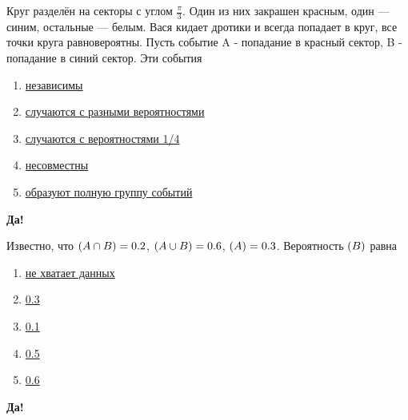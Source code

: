 \documentclass[t]{beamer}
\let\P\relax
\DeclareMathOperator{\P}{\mathbb{P}}
\begin{document}
 \begin{frame} \label{10-Yes} 
\begin{block}{10} 

Круг разделён на секторы с углом $\frac{\pi}{3}$. Один из них закрашен красным, один — синим, остальные — белым. Вася кидает дротики и всегда попадает в круг, все точки круга равновероятны. Пусть событие A - попадание в красный сектор, B - попадание в синий сектор. Эти события

  


 \end{block} 
\begin{enumerate} 
\item[] \hyperlink{10-No}{\beamergotobutton{} независимы}
\item[] \hyperlink{10-No}{\beamergotobutton{} случаются с разными вероятностями}
\item[] \hyperlink{10-No}{\beamergotobutton{} случаются с вероятностями 1/4}
\item[] \hyperlink{10-Yes}{\beamergotobutton{} несовместны}
\item[] \hyperlink{10-No}{\beamergotobutton{} образуют полную группу событий}
\end{enumerate} 

 \textbf{Да!} 
 \hyperlink{11}{}\end{frame} 


 \begin{frame} \label{11-Yes} 
\begin{block}{11} 

Известно, что $\P(A \cap B) = 0.2$, $\P(A \cup B) = 0.6$, $\P(A) = 0.3$. Вероятность $\P(B)$ равна

  


 \end{block} 
\begin{enumerate} 
\item[] \hyperlink{11-No}{\beamergotobutton{} не хватает данных}
\item[] \hyperlink{11-No}{\beamergotobutton{} 0.3}
\item[] \hyperlink{11-No}{\beamergotobutton{} 0.1}
\item[] \hyperlink{11-Yes}{\beamergotobutton{} 0.5}
\item[] \hyperlink{11-No}{\beamergotobutton{} 0.6}
\end{enumerate} 

 \textbf{Да!} 
 \hyperlink{12}{}\end{frame} 
\end{document}
